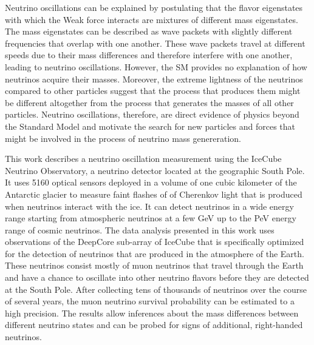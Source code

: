 Neutrino oscillations can be explained by postulating that the flavor eigenstates with which the Weak force interacts are mixtures of different mass eigenstates. The mass eigenstates can be described as wave packets with slightly different frequencies that overlap with one another. These wave packets travel at different speeds due to their mass differences and therefore interfere with one another, leading to neutrino oscillations. However, the SM provides no explanation of how neutrinos acquire their masses. Moreover, the extreme lightness of the neutrinos compared to other particles suggest that the process that produces them might be different altogether from the process that generates the masses of all other particles. Neutrino oscillations, therefore, are direct evidence of physics beyond the Standard Model and motivate the search for new particles and forces that might be involved in the process of neutrino mass genereration.

This work describes a neutrino oscillation measurement using the IceCube Neutrino Observatory, a neutrino detector located at the geographic South Pole. It uses 5160 optical sensors deployed in a volume of one cubic kilometer of the Antarctic glacier to measure faint flashes of of Cherenkov light that is produced when neutrinos interact with the ice. It can detect neutrinos in a wide energy range starting from atmospheric neutrinos at a few GeV up to the PeV energy range of cosmic neutrinos. The data analysis presented in this work uses observations of the DeepCore sub-array of IceCube that is specifically optimized for the detection of neutrinos that are produced in the atmosphere of the Earth. These neutrinos consist mostly of muon neutrinos that travel through the Earth and have a chance to oscillate into other neutrino flavors before they are detected at the South Pole. After collecting tens of thousands of neutrinos over the course of several years, the muon neutrino survival probability can be estimated to a high precision. The results allow inferences about the mass differences between different neutrino states and can be probed for signs of additional, right-handed neutrinos.

